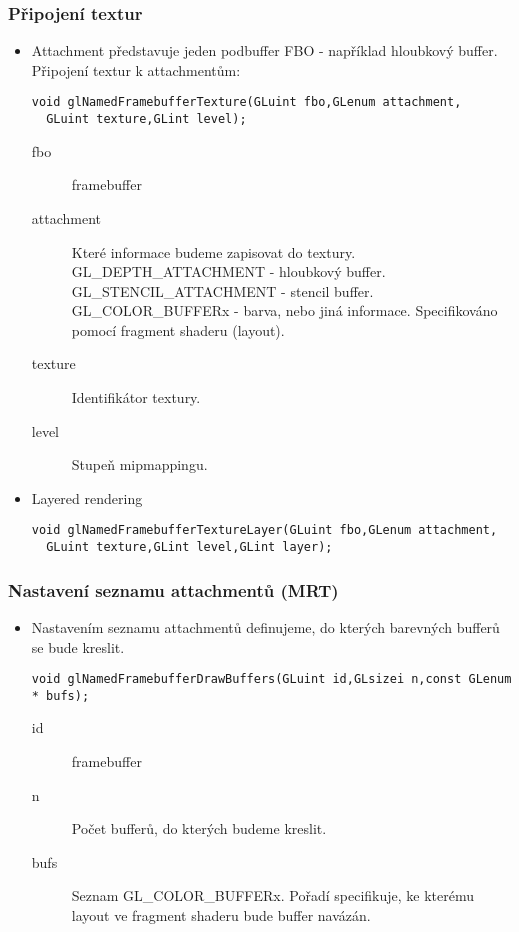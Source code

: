 \begin{frame}[fragile]
\frametitle{Připojení textur}
  \begin{itemize}
    \item{
    Attachment představuje jeden podbuffer FBO - například hloubkový buffer.
    Připojení textur k attachmentům:
{\scriptsize
\begin{verbatim}
void glNamedFramebufferTexture(GLuint fbo,GLenum attachment,
  GLuint texture,GLint level);
\end{verbatim}
}
    \begin{description}
    \item[fbo] framebuffer
    \item[attachment] Které informace budeme zapisovat do textury.
    GL\_DEPTH\_ATTACHMENT - hloubkový buffer.
    GL\_STENCIL\_ATTACHMENT - stencil buffer.
    GL\_COLOR\_BUFFERx - barva, nebo jiná informace.
    Specifikováno pomocí fragment shaderu (layout).
    \item[texture] Identifikátor textury.
    \item[level] Stupeň mipmappingu.
    \end{description}
    }
    \item Layered rendering
{\scriptsize
\begin{verbatim}
void glNamedFramebufferTextureLayer(GLuint fbo,GLenum attachment,
  GLuint texture,GLint level,GLint layer);
\end{verbatim}
}
  \end{itemize}
\end{frame}

\begin{frame}[fragile]
\frametitle{Nastavení seznamu attachmentů (MRT)}
  \begin{itemize}
    \item{
    Nastavením seznamu attachmentů definujeme, do kterých barevných bufferů se bude kreslit.
{\scriptsize
\begin{verbatim}
void glNamedFramebufferDrawBuffers(GLuint id,GLsizei n,const GLenum * bufs);
\end{verbatim}
}
    \begin{description}
    \item[id] framebuffer
    \item[n] Počet bufferů, do kterých budeme kreslit.
    \item[bufs] Seznam GL\_COLOR\_BUFFERx.
    Pořadí specifikuje, ke kterému layout ve fragment shaderu bude buffer navázán.
    \end{description}
    }
  \end{itemize}
\end{frame}

